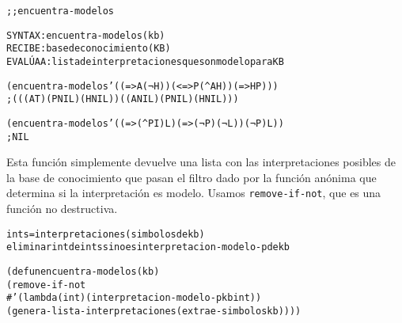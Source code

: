 \begin{aibox}{\function}
\begin{alltt}
;; encuentra-modelos

SYNTAX: encuentra-modelos (kb)
RECIBE   : base de conocimiento (KB)
EVALÚA A : lista de interpretaciones que son modelo para KB

\end{alltt}
\end{aibox}

\begin{aibox}{\examples}
\begin{alltt}
(encuentra-modelos '((=> A (¬ H)) (<=> P (^ A  H)) (=> H P))) 
; (((A T) (P NIL) (H NIL)) ((A NIL) (P NIL) (H NIL)))

(encuentra-modelos '((=> (^ P I)  L)  (=> (¬ P) (¬ L)) (¬ P) L)) 
; NIL

\end{alltt}

\end{aibox}

\begin{aibox}{\comments}
Esta función simplemente devuelve una lista con las interpretaciones posibles de la base de conocimiento que pasan el filtro dado por la función anónima que determina si la interpretación es modelo. Usamos \texttt{remove-if-not}, que es una función no destructiva.
\end{aibox}
\begin{aibox}{\pseudocode}
\begin{alltt}
ints = interpretaciones(simbolos de kb)
eliminar int de ints si no es interpretacion-modelo-p de kb

\end{alltt}
\end{aibox}
\begin{aibox}{\code}

\begin{alltt}

(defun encuentra-modelos (kb) 
  (remove-if-not 
    #'(lambda (int) (interpretacion-modelo-p kb int)) 
    (genera-lista-interpretaciones (extrae-simbolos kb))))

\end{alltt}
\end{aibox}
